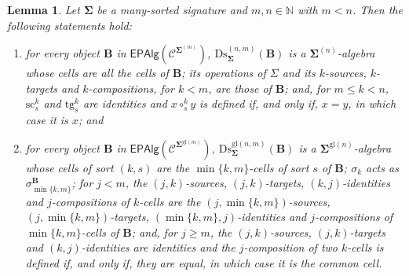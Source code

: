 \documentclass[a4paper, reqno
]{amsart}
\newcommand{\sig}[1]{\mathbf{#1}}             %
\newcommand{\spec}[1]{\boldsymbol{\mathcal{#1}}} %
\newcommand{\gl}{\mathrm{gl}}                %
\newcommand{\src}{\mathrm{sc}}
\newcommand{\tgt}{\mathrm{tg}}
\newcommand{\Ds}{\mathrm{Ds}}
\theoremstyle{plain}
\newtheorem{lemma}[theorem]{Lemma}
\theoremstyle{definition}
\begin{document}
\begin{lemma}\label{LDiscDescription}
Let $\sig{\Sigma}$ be a many-sorted signature and $m,n\in\mathbb{N}$ with $m<n$.
Then the following statements hold:
\begin{enumerate}
\item for every object $\mathbf{B}$ in $\mathsf{EPAlg}(\spec{C}^{\sig{\Sigma}^{(m)}})$, $\Ds^{(n,m)}_{\sig{\Sigma}}(\mathbf{B})$ is a $\sig{\Sigma}^{(n)}$-algebra whose cells are all the cells of $\mathbf{B}$; its operations of $\Sigma$ and its $k$-sources, $k$-targets and $k$-compositions, for $k<m$, are those of $\mathbf{B}$; and, for $m\leq k<n$, $\src^{k}_{s}$ and $\tgt^{k}_{s}$ are identities and $x\circ^{k}_{s}y$ is defined if, and only if, $x=y$, in which case it is $x$; and
\item for every object $\mathbf{B}$ in $\mathsf{EPAlg}(\spec{C}^{\sig{\Sigma}^{\gl(m)}})$, $\Ds^{\gl(n,m)}_{\sig{\Sigma}}(\mathbf{B})$ is a $\sig{\Sigma}^{\gl(n)}$-algebra whose cells of sort $(k,s)$ are the $\min\{k,m\}$-cells of sort $s$ of $\mathbf{B}$; $\sigma_{k}$ acts as $\sigma^{\mathbf{B}}_{\min\{k,m\}}$; for $j<m$, the $(j,k)$-sources, $(j,k)$-targets, $(k,j)$-identities and $j$-compositions of $k$-cells are the $(j,\min\{k,m\})$-sources, $(j,\min\{k,m\})$-targets, $(\min\{k,m\},j)$-identities and $j$-compositions of $\min\{k,m\}$-cells of $\mathbf{B}$; and, for $j\geq m$, the $(j,k)$-sources, $(j,k)$-targets and $(k,j)$-identities are identities and the $j$-composition of two $k$-cells is defined if, and only if, they are equal, in which case it is the common cell.
\end{enumerate}
\end{lemma}
\end{document}
